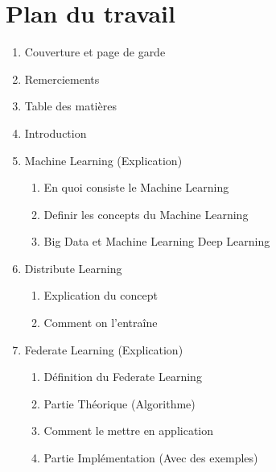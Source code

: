\documentclass[12pt,a4paper]{article}
\begin{document}
\part*{Plan du travail}

\begin{enumerate}
	\item Couverture et page de garde
	\item Remerciements
	\item Table des matières
	\item Introduction
	\item Machine Learning (Explication)
		\begin{enumerate}
			\item En quoi consiste le Machine Learning
			\item Definir les concepts du Machine Learning
			\item Big Data et Machine Learning
			\itemp Deep Learning
		\end{enumerate}
	\item Distribute Learning
		\begin{enumerate}
			\item Explication du concept
			\item Comment on l'entraîne
		\end{enumerate}
	\item Federate Learning (Explication)
		\begin{enumerate}
			\item Définition du Federate Learning
			\item Partie Théorique (Algorithme)
			\item Comment le mettre en application
			\item Partie Implémentation (Avec des exemples)
		\end{enumerate}
\end{enumerate}
	






 
\end{document}

